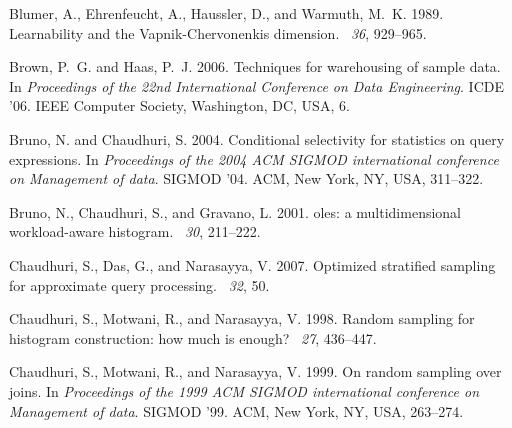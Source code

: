 \begin{thebibliography}{}
{\sc Blumer, A.}, {\sc Ehrenfeucht, A.}, {\sc Haussler, D.}, {\sc and} {\sc
  Warmuth, M.~K.} 1989.
\newblock Learnability and the {V}apnik-{C}hervonenkis dimension.
~{\em 36}, 929--965.

{\sc Brown, P.~G.} {\sc and} {\sc Haas, P.~J.} 2006.
\newblock Techniques for warehousing of sample data.
\newblock In {\em Proceedings of the 22nd International Conference on Data
  Engineering}. ICDE '06. IEEE Computer Society, Washington, DC, USA, 6.

{\sc Bruno, N.} {\sc and} {\sc Chaudhuri, S.} 2004.
\newblock Conditional selectivity for statistics on query expressions.
\newblock In {\em Proceedings of the 2004 ACM SIGMOD international conference
  on Management of data}. SIGMOD '04. ACM, New York, NY, USA, 311--322.

{\sc Bruno, N.}, {\sc Chaudhuri, S.}, {\sc and} {\sc Gravano, L.} 2001.
oles: a multidimensional workload-aware histogram.
~{\em 30}, 211--222.

{\sc Chaudhuri, S.}, {\sc Das, G.}, {\sc and} {\sc Narasayya, V.} 2007.
\newblock Optimized stratified sampling for approximate query processing.
~{\em 32}, 50.

{\sc Chaudhuri, S.}, {\sc Motwani, R.}, {\sc and} {\sc Narasayya, V.} 1998.
\newblock Random sampling for histogram construction: how much is enough?
~{\em 27}, 436--447.

{\sc Chaudhuri, S.}, {\sc Motwani, R.}, {\sc and} {\sc Narasayya, V.} 1999.
\newblock On random sampling over joins.
\newblock In {\em Proceedings of the 1999 ACM SIGMOD international conference
  on Management of data}. SIGMOD '99. ACM, New York, NY, USA, 263--274.


\end{thebibliography}
